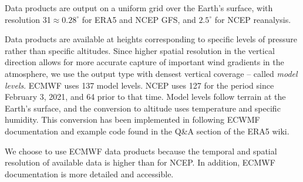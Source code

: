 \documentclass[twocolumn,twocolappendix]{openjournal}
\begin{document}
Data products are output on a uniform grid over the Earth's surface, with resolution 31\km $\approx 0.28^\circ$ for ERA5 and NCEP GFS, and $2.5^\circ$ for NCEP reanalysis.

Data products are available at heights corresponding to specific levels of pressure rather than specific altitudes.
Since higher spatial resolution in the vertical direction allows for more accurate capture of important wind gradients in the atmosphere, we use the output type with densest vertical coverage -- called \textit{model levels}. 
ECMWF uses 137 model levels. 
NCEP uses 127 for the period since February 3, 2021, and 64 prior to that time.
Model levels follow terrain at the Earth's surface, and the conversion to altitude uses temperature and specific humidity.
This conversion has been implemented in \psfws following ECWMF documentation and example code found in the Q\&A section of the ERA5 wiki.

We choose to use ECMWF data products because the temporal and spatial resolution of available data is higher than for NCEP.
In addition, ECMWF documentation is more detailed and accessible.

{}

\end{document}
